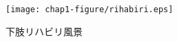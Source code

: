 \begin{figure}[tbp]
	\centering
			\texttt{[image: chap1-figure/rihabiri.eps]}
	\caption{下肢リハビリ風景}
	\label{fig:rihabiri}
\end{figure}

